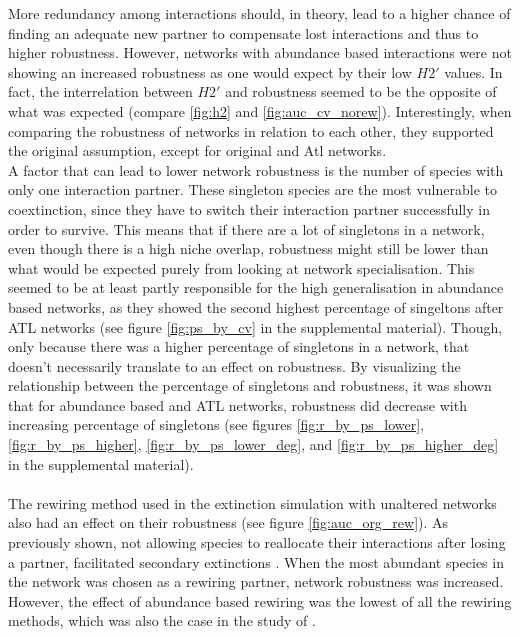 \documentclass[12pt,a4paper]{article}
\begin{document}
More redundancy among interactions should, in theory, lead to a higher chance of finding an adequate new partner to compensate lost interactions and thus to higher robustness. However, networks with abundance based interactions were not showing an increased robustness as one would expect by their low $H2'$ values. In fact, the interrelation between $H2'$ and robustness seemed to be the opposite of what was expected (compare \ref{fig:h2} and \ref{fig:auc_cv_norew}). Interestingly, when comparing the robustness of networks in relation to each other, they supported the original assumption, except for original and Atl networks.\\ A factor that can lead to lower network robustness is the number of species with only one interaction partner. These singleton species are the most vulnerable to coextinction, since they have to switch their interaction partner successfully in order to survive. This means that if there are a lot of singletons in a network, even though there is a high niche overlap, robustness might still be lower than what would be expected purely from looking at network specialisation. This seemed to be at least partly responsible for the high generalisation in abundance based networks, as they showed the second highest percentage of singeltons after ATL networks (see figure \ref{fig:ps_by_cv} in the supplemental material). Though, only because there was a higher percentage of singletons in a network, that doesn't necessarily translate to an effect on robustness. By visualizing the relationship between the percentage of singletons and robustness, it was shown that for abundance based  and ATL networks, robustness did decrease with increasing percentage of singletons (see figures \ref{fig:r_by_ps_lower},\ref{fig:r_by_ps_higher}, \ref{fig:r_by_ps_lower_deg}, and \ref{fig:r_by_ps_higher_deg} in the supplemental material).\paragraph{}

The rewiring method used in the extinction simulation with unaltered networks also had an effect on their robustness (see figure \ref{fig:auc_org_rew}). As previously shown, not allowing species to reallocate their interactions after losing a partner, facilitated secondary extinctions \parencite{Kaiser-Bunbury2010, Schleuning2016, Timoteo2016, Costa2018}. When the most abundant species in the network was chosen as a rewiring partner, network robustness was increased. However, the effect of abundance based rewiring was the lowest of all the rewiring methods, which was also the case in the study of \citeauthor{Vizentin-Bugoni2019} \parencite{Vizentin-Bugoni2019}. 
\end{document}
